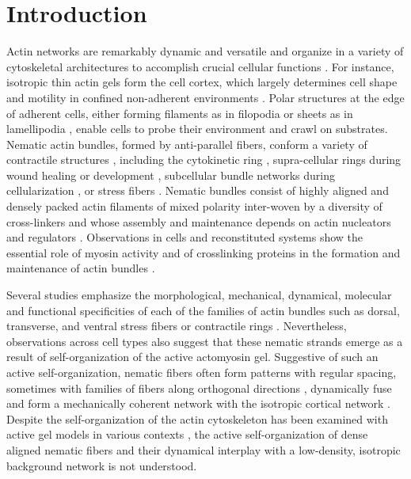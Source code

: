 \section{Introduction}

	Actin networks are remarkably dynamic and versatile and organize in a variety of cytoskeletal architectures to accomplish crucial cellular functions \cite{Banerjee2020}. For instance, isotropic thin actin gels form the cell cortex, which largely determines cell shape \cite{chugh2018} and motility in confined non-adherent environments \cite{blaser2006, Ruprecht:2015aa}. Polar structures at the edge of adherent cells, either forming filaments as in filopodia or sheets as in lamellipodia \cite{blanchoin2014}, enable cells to probe their environment and crawl on substrates. Nematic actin bundles, formed by anti-parallel fibers, conform a variety of contractile structures \cite{schwayer2016}, including the cytokinetic ring \cite{anne2016}, supra-cellular rings during wound healing \cite{martin1992} or development \cite{Krieg:2008aa}, subcellular bundle networks during cellularization \cite{dudin2019}, or stress fibers \cite{10.1242/jcs.236604,tojkander2012, tojkander2015}. Nematic bundles consist of highly aligned and densely packed actin filaments of mixed polarity inter-woven by a diversity of cross-linkers and whose assembly and maintenance depends on actin nucleators and regulators \cite{tojkander2012,blanchoin2014,schwayer2016,chugh2018,Banerjee2020}. Observations in cells and reconstituted systems show the essential role of myosin activity and of crosslinking proteins in the formation and maintenance of actin bundles \cite{chrzanowska1996, thoresen2011,strehle2011,laporte2012,chugh2018,lehtimaki2021}.
	
	Several studies emphasize the morphological, mechanical, dynamical, molecular and functional specificities of each of the families of actin bundles such as dorsal, transverse, and ventral stress fibers or contractile rings \cite{hotulainen2006,naumanen2008,tojkander2012,tojkander2015,doi:10.1091/mbc.E18-02-0106}. Nevertheless, observations across cell types also suggest that these nematic strands emerge as a result of self-organization of the active actomyosin gel. Suggestive of such an active self-organization, nematic fibers often form patterns with regular spacing, sometimes with families of fibers along orthogonal directions  \cite{tee2015, tojkander2015,wirshing2017, yolland2019, jalal2019,10.1242/jcs.236604}, dynamically fuse \cite{hotulainen2006,wirshing2017} and form a mechanically coherent network with the isotropic cortical network \cite{vignaud2021,lehtimaki2021}. Despite the self-organization of the actin cytoskeleton has been examined with active gel models in various contexts \cite{callan2013,kruse2004,hannezo2015},
	the active self-organization of dense aligned nematic fibers and their dynamical interplay with a low-density, isotropic background network is not understood.

